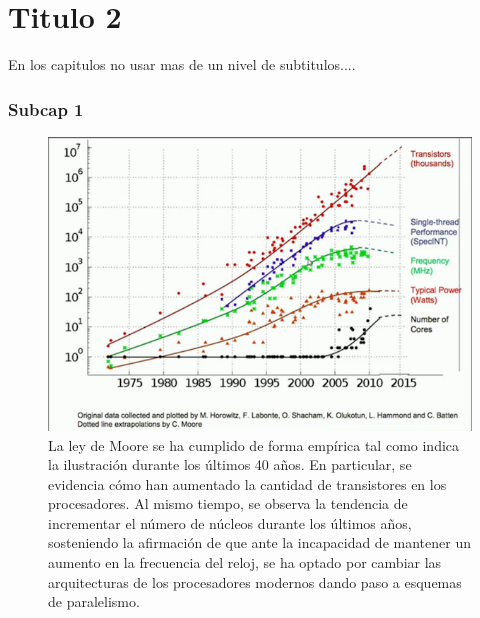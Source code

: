 \chapter{Titulo 2}
\label{c2} %

En los capitulos no usar mas de un nivel de subtitulos....


\subsection{Subcap 1}

\begin{figure}[H]
\begin{center}
   \includegraphics[scale=0.7]{images/c02/moore_and_speed.png}
\end{center}

\caption[Ley de Moore]{La ley de Moore\footnotemark{} se ha cumplido de forma empírica tal como indica la ilustración durante los últimos 40 años. En particular, se evidencia cómo han aumentado la cantidad de transistores en los procesadores. Al mismo tiempo, se observa la tendencia de incrementar el número de núcleos durante los últimos años, sosteniendo la afirmación de que ante la incapacidad de mantener un aumento en la frecuencia del reloj, se ha optado por cambiar las arquitecturas de los procesadores modernos dando paso a esquemas de paralelismo.}
\label{c02_moore_law} %
\end{figure}

